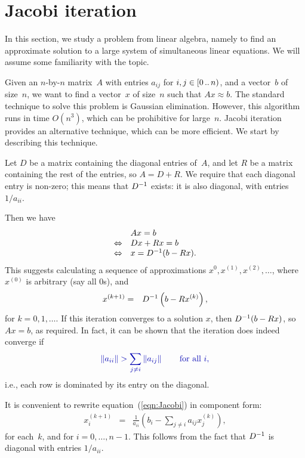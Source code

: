 \section{Jacobi iteration}

In this section, we study a problem from linear algebra, namely to find an
approximate solution to a large system of simultaneous linear equations.  We
will assume some familiarity with the topic. 

Given an $n$-by-$n$ matrix~$A$ with entries $a_{ij}$ for $i,j \in
[0 \,..\, n)$, and a vector~$b$ of size~$n$, we want to find a vector~$x$
of size~$n$ such that $Ax \approx b$.
%
The standard technique to solve this problem is Gaussian elimination.
However, this algorithm runs in time $O(n^3)$, which can be prohibitive for
large~$n$.  Jacobi iteration provides an alternative technique, which can be
more efficient.  We start by describing this technique.

Let $D$ be a matrix containing the diagonal entries of~$A$, and let $R$ be a
matrix containing the rest of the entries, so $A = D+R$.  We require that each
diagonal entry is non-zero; this means that $D^{-1}$ exists: it is also
diagonal, with entries $1/a_{ii}$.

Then we have
\[
\begin{array}{cl}
& Ax = b \\
\Leftrightarrow & Dx + Rx = b \\
\Leftrightarrow & x = D^{-1} (b - Rx).
\end{array}
\]
This suggests calculating a sequence of approximations $x^{0}, x^{(1)},
x^{(2)}, \ldots$, where $x^{(0)}$ is arbitrary (say all $0$s), and
\begin{eqnarray}
x^{(k+1)} & = & D^{-1} \left( b-R x^{(k)} \right), \label{eqn:Jacobi}
\end{eqnarray}
for $k = 0,1,\ldots$.
If this iteration converges to a solution $x$, then $D^{-1} (b - Rx)$, so
$Ax = b$, as required.  In fact, it can be shown that the iteration does
indeed converge if
\[\mstyle
 \left \| a_{ii} \right \| > \sum_{j \ne i} \left \| a_{ij} \right \| 
  \qquad \mbox{for all $i$}, 
\]
i.e., each row is dominated by its entry on the diagonal. 

It is convenient to rewrite equation~(\ref{eqn:Jacobi}) in component form:
\begin{eqnarray}
x^{(k+1)}_i & = & \frac{1}{a_{ii}} \left(b_i -\sum_{j\ne i} a_{ij} x^{(k)}_j\right),
\label{eqn:Jacobi-component}
\end{eqnarray}
for each~$k$, and for $i = 0,\ldots,n-1$.  This follows from the fact that
$D^{-1}$ is diagonal with entries  $1/a_{ii}$.

